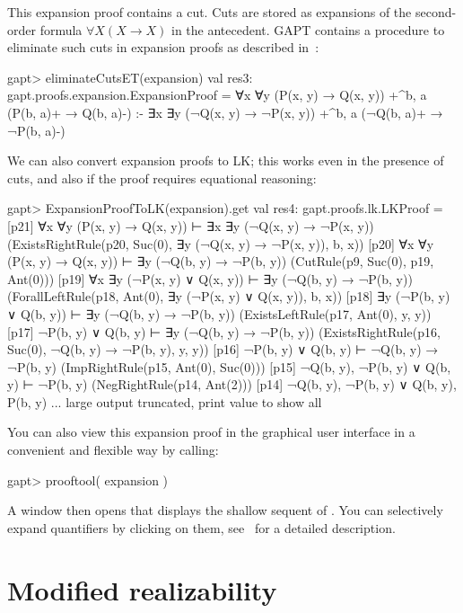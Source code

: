 \documentclass[a4paper,11pt]{book}
\newcommand{\impl}{\to} %
\newcommand{\cli}[1]{{\ttfamily {#1}}}
\begin{document}
This expansion proof contains a cut.  Cuts are stored as expansions of the
second-order formula $\forall X (X \impl X)$ in the antecedent.  GAPT contains
a procedure to eliminate such cuts in expansion proofs as described
in~\cite{Hetzl2013Expansion}:
\begin{clilisting}
  gapt> eliminateCutsET(expansion)
  val res3: gapt.proofs.expansion.ExpansionProof = ∀x ∀y (P(x, y) → Q(x, y)) +^{b, a} (P(b, a)+ → Q(b, a)-)
  :-
  ∃x ∃y (¬Q(x, y) → ¬P(x, y)) +^{b, a} (¬Q(b, a)+ → ¬P(b, a)-)

\end{clilisting}

We can also convert expansion proofs to LK; this works even in the presence of
cuts, and also if the proof requires equational reasoning:
\begin{clilisting}
  gapt> ExpansionProofToLK(expansion).get
  val res4: gapt.proofs.lk.LKProof = [p21] ∀x ∀y (P(x, y) → Q(x, y)) ⊢ ∃x ∃y (¬Q(x, y) → ¬P(x, y))    (ExistsRightRule(p20, Suc(0), ∃y (¬Q(x, y) → ¬P(x, y)), b, x))
  [p20] ∀x ∀y (P(x, y) → Q(x, y)) ⊢ ∃y (¬Q(b, y) → ¬P(b, y))    (CutRule(p9, Suc(0), p19, Ant(0)))
  [p19] ∀x ∃y (¬P(x, y) ∨ Q(x, y)) ⊢ ∃y (¬Q(b, y) → ¬P(b, y))    (ForallLeftRule(p18, Ant(0), ∃y (¬P(x, y) ∨ Q(x, y)), b, x))
  [p18] ∃y (¬P(b, y) ∨ Q(b, y)) ⊢ ∃y (¬Q(b, y) → ¬P(b, y))    (ExistsLeftRule(p17, Ant(0), y, y))
  [p17] ¬P(b, y) ∨ Q(b, y) ⊢ ∃y (¬Q(b, y) → ¬P(b, y))    (ExistsRightRule(p16, Suc(0), ¬Q(b, y) → ¬P(b, y), y, y))
  [p16] ¬P(b, y) ∨ Q(b, y) ⊢ ¬Q(b, y) → ¬P(b, y)    (ImpRightRule(p15, Ant(0), Suc(0)))
  [p15] ¬Q(b, y), ¬P(b, y) ∨ Q(b, y) ⊢ ¬P(b, y)    (NegRightRule(p14, Ant(2)))
  [p14] ¬Q(b, y), ¬P(b, y) ∨ Q(b, y), P(b, y)  ... large output truncated, print value to show all

\end{clilisting}

You can also view this expansion proof in the graphical user interface in
a convenient and flexible way by calling:
\begin{clilisting}
  gapt> prooftool( expansion )

\end{clilisting}

A window then opens that displays the shallow sequent of \cli{expansion}.  You
can selectively expand quantifiers by clicking on them,
see~\cite{Hetzl13Understanding} for a detailed description.

\section{Modified realizability}
\end{document}
